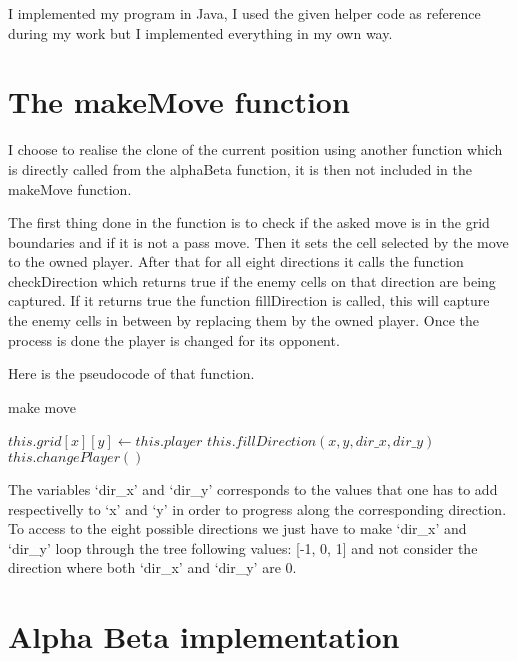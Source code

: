 I implemented my program in Java, I used the given helper code as reference during my work but I implemented everything in my own way.

\section{The makeMove function}

I choose to realise the clone of the current position using another function which is directly called from the alphaBeta function, it is then not included in the makeMove function.

The first thing done in the function is to check if the asked move is in the grid boundaries and if it is not a pass move.
Then it sets the cell selected by the move to the owned player.
After that for all eight directions it calls the function checkDirection which returns true if the enemy cells on that direction are being captured.
If it returns true the function fillDirection is called, this will capture the enemy cells in between by replacing them by the owned player.
Once the process is done the player is changed for its opponent.

Here is the pseudocode of that function.

\FloatBarrier
\begin{algorithm}
    \caption{make move}
    \begin{algorithmic}[1]
                \State $this.grid[x][y] \gets this.player$
                        \State $this.fillDirection(x, y, dir\_x, dir\_y)$
                    \EndIf
                \EndFor
                \State $this.changePlayer()$
            \EndIf
        \EndProcedure
    \end{algorithmic}
\end{algorithm}
\FloatBarrier

The variables `dir\_x' and `dir\_y' corresponds to the values that one has to add respectivelly to `x' and `y' in order to progress along the corresponding direction.
To access to the eight possible directions we just have to make `dir\_x' and `dir\_y' loop through the tree following values: [-1, 0, 1] and not consider the direction where both `dir\_x' and `dir\_y' are 0.

\section{Alpha Beta implementation}

